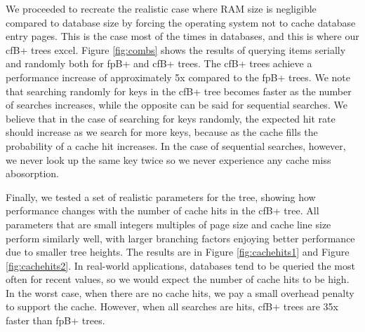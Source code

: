 \documentclass{article}
\begin{document}
We proceeded to recreate the realistic case where RAM size is negligible
compared to database size by
forcing the operating system not to cache database entry pages.
This is the case most of the times in databases, and this is where our cfB+
trees excel.
Figure \ref{fig:combs} shows the results of querying items serially and randomly
both for fpB+ and cfB+ trees.
The cfB+ trees achieve a performance increase of approximately 5x compared to
the fpB+ trees. We note that searching randomly for keys in the cfB+ tree becomes 
faster as the number of searches increases, while the opposite can be said for sequential searches. 
We believe that in the case of searching for keys randomly, the expected hit rate should increase 
as we search for more keys, because as the cache fills the probability of a cache hit increases. 
In the case of sequential searches, however, we never look up the same key twice so we never experience any 
cache miss abosorption.

Finally, we tested a set of realistic parameters for the tree, showing how
performance changes with the number
of cache hits in the cfB+ tree. All parameters that are small integers multiples
of page size and cache line
size perform similarly well, with larger branching factors enjoying better performance due to 
smaller tree heights.
The results are in Figure \ref{fig:cachehits1} and Figure \ref{fig:cachehits2}.
In real-world applications, databases tend to be queried the most often for
recent values,
so we would expect the number of cache hits to be high.
In the worst case, when there are no cache hits, we pay a small overhead penalty
to support the cache.
However, when all searches are hits, cfB+ trees are 35x faster than fpB+ trees.
\end{document}
